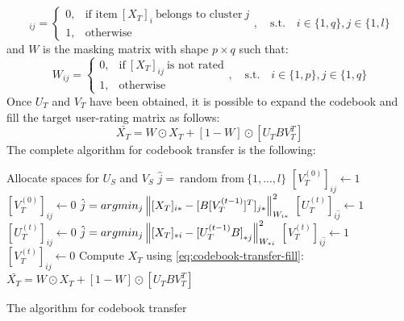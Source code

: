 \begin{equation}
[V_T]_{ij} =
\begin{cases}
0, & \text{if item}\ [X_T]_{i}\ \text{belongs to cluster}\ j\\
1, & \text{otherwise}
\end{cases}
, \quad \text{s.t.} \quad i \in \{1,q\}, j \in \{1,l\}
\end{equation}
and $W$ is the masking matrix with shape $p \times q$ such that:
\begin{equation}
W_{ij} =
\begin{cases}
0, & \text{if}\ [X_T]_{ij}\ \text{is not rated}\\
1, & \text{otherwise}
\end{cases}
, \quad \text{s.t.} \quad i \in \{1,p\}, j \in \{1,q\}
\end{equation}
Once $U_T$ and $V_T$ have been obtained, it is possible to expand the codebook and fill the target user-rating matrix as follows:
\begin{equation}
\label{eq:codebook-transfer-fill}
\bar{X_T} = W \odot X_T + [1 - W] \odot [U_T B V_T^T]
\end{equation}
The complete algorithm for codebook transfer is the following:
\vskip 0.7cm
\begin{algorithm}[H]
Allocate spaces for $U_S$ and $V_S$\;
{
  $\hat{j} =\ \text{random from}\ \{1,...,l\}$\;
  $[V_T^{(0)}]_{i\hat{j}} \gets 1$\;
  {
    $[V_T^{(0)}]_{ij} \gets 0$\;
  }
}
{
  {
    $\hat{j} = argmin_j \left\lVert[X_T]_{i*} - [B [V_T^{(t - 1)}]^T]_{j*}\right\rVert_{W_{i*}}^2$\;
    $[U_T^{(t)}]_{i\hat{j}} \gets 1$\;
    {
      $[U_T^{(t)}]_{ij} \gets 0$\;
    }
  }
  {
    $\hat{j} = argmin_j \left\lVert[X_T]_{*i} - {[U_T^{(t - 1)} B]}_{*j}\right\rVert_{W_{*i}}^2$\;
    $[V_T^{(t)}]_{i\hat{j}} \gets 1$\;
    {
      $[V_T^{(t)}]_{ij} \gets 0$\;
    }
  }
}
Compute $X_T$ using \autoref{eq:codebook-transfer-fill}:
$\bar{X_T} = W \odot X_T + [1 - W] \odot [U_T B V_T^T]$\;
\caption{The algorithm for codebook transfer}
\label{al:codebook-transfer}
\end{algorithm}
